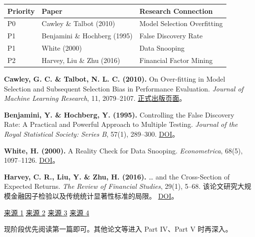 \begin{readertable}
\begin{longtable}[]{@{}
  >{\raggedright\arraybackslash}p{}
  >{\raggedright\arraybackslash}p{}
  >{\raggedright\arraybackslash}p{}@{}}
\toprule
Priority & Paper & Research Connection \\
\midrule
\endhead
P0 & Cawley \& Talbot (2010) & Model Selection Overfitting \\
P1 & Benjamini \& Hochberg (1995) & False Discovery Rate \\
P1 & White (2000) & Data Snooping \\
P2 & Harvey, Liu \& Zhu (2016) & Financial Factor Mining \\
\bottomrule
\end{longtable}
\end{readertable}

\textbf{Cawley, G. C. \& Talbot, N. L. C. (2010).} On Over-fitting in Model Selection and Subsequent Selection Bias in Performance Evaluation. \emph{Journal of Machine Learning Research}, 11, 2079--2107. \href{https://www.jmlr.org/papers/v11/cawley10a.html}{正式出版页面}。

\textbf{Benjamini, Y. \& Hochberg, Y. (1995).} Controlling the False Discovery Rate: A Practical and Powerful Approach to Multiple Testing. \emph{Journal of the Royal Statistical Society: Series B}, 57(1), 289--300. \href{https://doi.org/10.1111/j.2517-6161.1995.tb02031.x}{DOI}。

\textbf{White, H. (2000).} A Reality Check for Data Snooping. \emph{Econometrica}, 68(5), 1097--1126. \href{https://doi.org/10.1111/1468-0262.00152}{DOI}。

\textbf{Harvey, C. R., Liu, Y. \& Zhu, H. (2016).} \ldots{} and the Cross-Section of Expected Returns. \emph{The Review of Financial Studies}, 29(1), 5--68. 该论文研究大规模金融因子检验以及传统统计显著性标准的局限。 \href{https://doi.org/10.1093/rfs/hhv059}{DOI}。

\href{https://www.jmlr.org/beta/papers/v11/cawley10a.html}{来源 1} \href{https://academic.oup.com/jrsssb/article/57/1/289/7035855?login=false}{来源 2} \href{https://onlinelibrary.wiley.com/doi/10.1111/1468-0262.00152}{来源 3} \href{https://academic.oup.com/rfs/article-abstract/29/1/5/1843824}{来源 4}

现阶段优先阅读第一篇即可。其他论文等进入 Part IV、Part V 时再深入。

